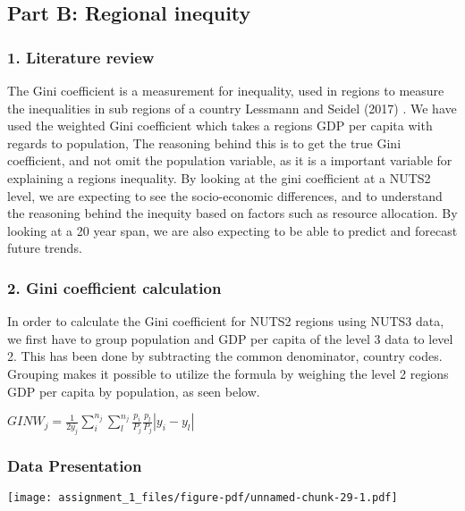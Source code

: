 \documentclass[
  letterpaper,
  DIV=11,
  numbers=noendperiod]{scrartcl}
\begin{document}
\hypertarget{part-b-regional-inequity}{%
\subsection{Part B: Regional inequity}\label{part-b-regional-inequity}}

\hypertarget{literature-review}{%
\subsubsection{1. Literature review}\label{literature-review}}

The Gini coefficient is a measurement for inequality, used in regions to
measure the inequalities in sub regions of a country Lessmann and Seidel
(2017) . We have used the weighted Gini coefficient which takes a
regions GDP per capita with regards to population, The reasoning behind
this is to get the true Gini coefficient, and not omit the population
variable, as it is a important variable for explaining a regions
inequality. By looking at the gini coefficient at a NUTS2 level, we are
expecting to see the socio-economic differences, and to understand the
reasoning behind the inequity based on factors such as resource
allocation. By looking at a 20 year span, we are also expecting to be
able to predict and forecast future trends.

\hypertarget{gini-coefficient-calculation}{%
\subsubsection{2. Gini coefficient
calculation}\label{gini-coefficient-calculation}}

In order to calculate the Gini coefficient for NUTS2 regions using NUTS3
data, we first have to group population and GDP per capita of the level
3 data to level 2. This has been done by subtracting the common
denominator, country codes. Grouping makes it possible to utilize the
formula by weighing the level 2 regions GDP per capita by population, as
seen below.

\(GINW_j=\frac{1}{2 \bar{y_j}} \sum_{i}^{n_j}\sum_{l}^{n_j}\frac{p_i}{P_j} \frac{p_l}{P_j} |y_i-y_l|\)

\hypertarget{data-presentation}{%
\subsubsection{Data Presentation}\label{data-presentation}}

\texttt{[image: assignment\_1\_files/figure-pdf/unnamed-chunk-29-1.pdf]}
\end{document}
